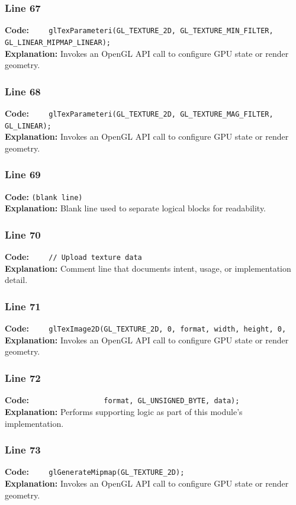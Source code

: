 \documentclass[11pt,a4paper]{article}
\begin{document}
\subsubsection*{Line 67}
\textbf{Code:} \verb|    glTexParameteri(GL_TEXTURE_2D, GL_TEXTURE_MIN_FILTER, GL_LINEAR_MIPMAP_LINEAR);|\\
\textbf{Explanation:} Invokes an OpenGL API call to configure GPU state or render geometry.

\subsubsection*{Line 68}
\textbf{Code:} \verb|    glTexParameteri(GL_TEXTURE_2D, GL_TEXTURE_MAG_FILTER, GL_LINEAR);|\\
\textbf{Explanation:} Invokes an OpenGL API call to configure GPU state or render geometry.

\subsubsection*{Line 69}
\textbf{Code:} \texttt{(blank line)}\\
\textbf{Explanation:} Blank line used to separate logical blocks for readability.

\subsubsection*{Line 70}
\textbf{Code:} \verb|    // Upload texture data|\\
\textbf{Explanation:} Comment line that documents intent, usage, or implementation detail.

\subsubsection*{Line 71}
\textbf{Code:} \verb|    glTexImage2D(GL_TEXTURE_2D, 0, format, width, height, 0,|\\
\textbf{Explanation:} Invokes an OpenGL API call to configure GPU state or render geometry.

\subsubsection*{Line 72}
\textbf{Code:} \verb|                 format, GL_UNSIGNED_BYTE, data);|\\
\textbf{Explanation:} Performs supporting logic as part of this module's implementation.

\subsubsection*{Line 73}
\textbf{Code:} \verb|    glGenerateMipmap(GL_TEXTURE_2D);|\\
\textbf{Explanation:} Invokes an OpenGL API call to configure GPU state or render geometry.
\end{document}
